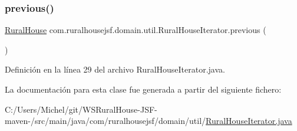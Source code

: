 \subsubsection{\texorpdfstring{previous()}{previous()}}
{\footnotesize\ttfamily \mbox{\hyperlink{classcom_1_1ruralhousejsf_1_1domain_1_1_rural_house}{Rural\+House}} com.\+ruralhousejsf.\+domain.\+util.\+Rural\+House\+Iterator.\+previous (\begin{DoxyParamCaption}{ }\end{DoxyParamCaption})}



Definición en la línea 29 del archivo Rural\+House\+Iterator.\+java.



La documentación para esta clase fue generada a partir del siguiente fichero\+:\begin{DoxyCompactItemize}
\item 
C\+:/\+Users/\+Michel/git/\+W\+S\+Rural\+House-\/\+J\+S\+F-\/maven-\//src/main/java/com/ruralhousejsf/domain/util/\mbox{\hyperlink{_rural_house_iterator_8java}{Rural\+House\+Iterator.\+java}}\end{DoxyCompactItemize}
